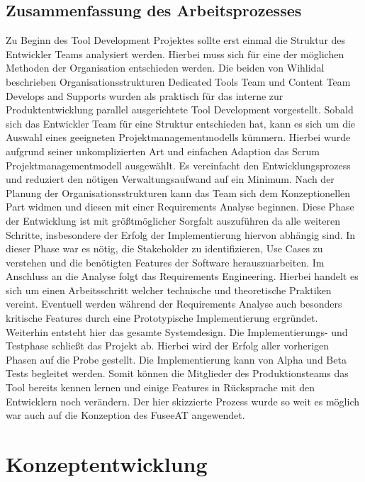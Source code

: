 \documentclass[pagesize, paper=a4, fontsize=12pt, titlepage=true, headings=small, headnosepline, abstractoff, liststotoc, nochapterprefix, plainheadsepline, twoside]{scrreprt}
\begin{document}
\section{Zusammenfassung des Arbeitsprozesses}
Zu Beginn des Tool Development Projektes sollte erst einmal die Struktur des Entwickler Teams analysiert werden. Hierbei muss sich für eine der möglichen Methoden der Organisation entschieden werden. Die beiden von Wihlidal \cite[S. ]{Wihlidal2006} beschrieben Organisationsstrukturen \glqq Dedicated Tools Team\grqq{} und \glqq Content Team Develops and Supports\grqq{} wurden als praktisch für das interne zur Produktentwicklung parallel ausgerichtete Tool Development vorgestellt. Sobald sich das Entwickler Team für eine Struktur entschieden hat, kann es sich um die Auswahl eines geeigneten Projektmanagementmodells kümmern. Hierbei wurde aufgrund seiner unkomplizierten Art und einfachen Adaption das Scrum Projektmanagementmodell ausgewählt. Es vereinfacht den Entwicklungsprozess und reduziert den nötigen Verwaltungsaufwand auf ein Minimum.
Nach der Planung der Organisationsstrukturen kann das Team sich dem Konzeptionellen Part widmen und diesen mit einer Requirements Analyse beginnen. Diese Phase der Entwicklung ist mit größtmöglicher Sorgfalt auszuführen da alle weiteren Schritte, insbesondere der Erfolg der Implementierung hiervon abhängig sind. In dieser Phase war es nötig, die Stakeholder zu identifizieren, Use Cases zu verstehen und die benötigten Features der Software herauszuarbeiten. Im Anschluss an die Analyse folgt das Requirements Engineering. Hierbei handelt es sich um einen Arbeitsschritt welcher technische und theoretische Praktiken vereint. Eventuell werden während der Requirements Analyse auch besonders kritische Features durch eine Prototypische Implementierung ergründet. Weiterhin entsteht hier das gesamte Systemdesign.
Die Implementierungs- und Testphase schließt das Projekt ab. Hierbei wird der Erfolg aller vorherigen Phasen auf die Probe gestellt. Die Implementierung kann von Alpha und Beta Tests begleitet werden. Somit können die Mitglieder des Produktionsteams das Tool bereits kennen lernen und einige Features in Rücksprache mit den Entwicklern noch verändern.
Der hier skizzierte Prozess wurde so weit es möglich war auch auf die Konzeption des FuseeAT angewendet.

\chapter{Konzeptentwicklung}
\end{document}
